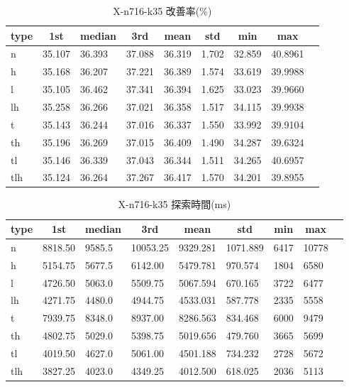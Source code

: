 \begin{table}[htbp]
    \caption{X-n716-k35 改善率(\%)}
    \begin{tabular}{|l|l|l|l|l|l|l|l|l|}\hline
    \multicolumn{1}{|c|}{\textbf{type}}
    &\multicolumn{1}{|c|}{\textbf{1st}}
    &\multicolumn{1}{c|}{\textbf{median}}
    &\multicolumn{1}{c|}{\textbf{3rd}}
    &\multicolumn{1}{c|}{\textbf{mean}}
    &\multicolumn{1}{c|}{\textbf{std}}
    &\multicolumn{1}{c|}{\textbf{min}}
    &\multicolumn{1}{c|}{\textbf{max}}\\\hline
	n & 35.107 & 36.393 & 37.088 & 36.319 & 1.702 & 32.859 & 40.8961\\\hline
	h & 35.168 & 36.207 & 37.221 & 36.389 & 1.574 & 33.619 & 39.9988\\\hline
	l & 35.105 & 36.462 & 37.341 & 36.394 & 1.625 & 33.023 & 39.9660\\\hline
	lh & 35.258 & 36.266 & 37.021 & 36.358 & 1.517 & 34.115 & 39.9938\\\hline
	t & 35.143 & 36.244 & 37.016 & 36.337 & 1.550 & 33.992 & 39.9104\\\hline
	th & 35.196 & 36.269 & 37.015 & 36.409 & 1.490 & 34.287 & 39.6324\\\hline
	tl & 35.146 & 36.339 & 37.043 & 36.344 & 1.511 & 34.265 & 40.6957\\\hline
	tlh & 35.124 & 36.264 & 37.267 & 36.417 & 1.570 & 34.201 & 39.8955\\\hline
	\end{tabular}
\end{table}
\begin{table}[htbp]
    \caption{X-n716-k35 探索時間(ms)}
    \begin{tabular}{|l|l|l|l|l|l|l|l|l|}\hline
    \multicolumn{1}{|c|}{\textbf{type}}
    &\multicolumn{1}{|c|}{\textbf{1st}}
    &\multicolumn{1}{c|}{\textbf{median}}
    &\multicolumn{1}{c|}{\textbf{3rd}}
    &\multicolumn{1}{c|}{\textbf{mean}}
    &\multicolumn{1}{c|}{\textbf{std}}
    &\multicolumn{1}{c|}{\textbf{min}}
    &\multicolumn{1}{c|}{\textbf{max}}\\\hline
	n & 8818.50 & 9585.5 & 10053.25 & 9329.281 & 1071.889 & 6417 & 10778\\\hline
	h & 5154.75 & 5677.5 & 6142.00 & 5479.781 & 970.574 & 1804 & 6580\\\hline
	l & 4726.50 & 5063.0 & 5509.75 & 5067.594 & 670.165 & 3722 & 6477\\\hline
	lh & 4271.75 & 4480.0 & 4944.75 & 4533.031 & 587.778 & 2335 & 5558\\\hline
	t & 7939.75 & 8348.0 & 8937.00 & 8286.563 & 834.468 & 6000 & 9479\\\hline
	th & 4802.75 & 5029.0 & 5398.75 & 5019.656 & 479.760 & 3665 & 5699\\\hline
	tl & 4019.50 & 4627.0 & 5061.00 & 4501.188 & 734.232 & 2728 & 5672\\\hline
	tlh & 3827.25 & 4023.0 & 4349.25 & 4012.500 & 618.025 & 2036 & 5113\\\hline
	\end{tabular}
\end{table}
